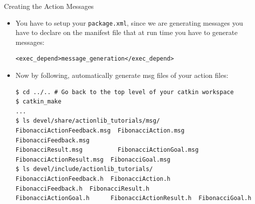 \begin{frame}{Creating the Action Messages}
\begin{itemize}
\begin{enumerate}
    \item use the \texttt{add\_action\_files} macro to declare the actions you want to be generated:
\begin{lstlisting}[language=syntax]  
add_action_files(
  DIRECTORY action
  FILES Fibonacci.action
)
\end{lstlisting}  

    \framebreak

    \item call the \texttt{generate\_messages} macro, not forgetting the dependencies on \texttt{actionlib\_msgs} and other message packages like \texttt{std\_msgs}:
\begin{lstlisting}[language=syntax]  
generate_messages(
  DEPENDENCIES actionlib_msgs std_msgs  # Or other packages containing msgs
)
\end{lstlisting}  

    \item add \texttt{actionlib\_msgs} to \texttt{catkin\_package} macro like this:
\begin{lstlisting}[language=syntax]  
catkin_package(
  CATKIN_DEPENDS actionlib_msgs
)
\end{lstlisting}  
    \begin{itemize}
     \item \texttt{catkin\_package} also specifies only \texttt{CATKIN\_DEPEND} to \texttt{actionlib\_msgs}. The transitive dependency on \texttt{message\_runtime} is happening automatically.
    \end{itemize}
   \end{enumerate}

  \framebreak
  
  \item You have to setup your \texttt{package.xml}, since we are generating messages you have to declare on the manifest file that at run time you have to generate messages:
\begin{lstlisting}[language=syntax]  
<exec_depend>message_generation</exec_depend>
\end{lstlisting}  

 \item Now by following, automatically generate msg files of your action files:
\begin{lstlisting}[language=shell]  
$ cd ../.. # Go back to the top level of your catkin workspace
$ catkin_make
...
$ ls devel/share/actionlib_tutorials/msg/
FibonacciActionFeedback.msg  FibonacciAction.msg        FibonacciFeedback.msg
FibonacciResult.msg          FibonacciActionGoal.msg    FibonacciActionResult.msg  FibonacciGoal.msg
$ ls devel/include/actionlib_tutorials/
FibonacciActionFeedback.h  FibonacciAction.h        FibonacciFeedback.h  FibonacciResult.h
FibonacciActionGoal.h      FibonacciActionResult.h  FibonacciGoal.h
\end{lstlisting}   
 \end{itemize} 
\end{frame}

